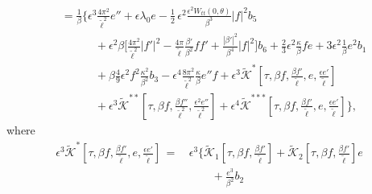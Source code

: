 \documentclass[10pt, reqno]{amsart}
\numberwithin{equation}{section}
\theoremstyle{definition}
\begin{document}
{\begin{align}
 & = \frac {1}\beta \Bigg\{\epsilon^3\frac{4\pi^2}{{\tilde\ell}^2} e'' + \epsilon\lambda_0 e
 -\frac{1}{2}\, \epsilon^2 \frac{ \epsilon^2W_{tt}(0, \theta)}{\beta^3}|f|^2 b_5
\nonumber\\[2mm]
 & \qquad \quad+ \epsilon^2\beta\Bigg[\frac{4\pi^2}{{\tilde\ell}^2}|f'|^2
-\frac{4\pi}{{\tilde\ell}}\frac{\beta'}{\beta^2}ff'
+\frac{|\beta'|^2}{\beta^4} |f|^2
\Bigg] b_6
  +\frac 23\epsilon^2 \frac{\kappa}{\beta} fe
 + 3\epsilon^2 \frac{1}{\beta}e^2b_1
 \nonumber\\[2mm]
 & \qquad \quad
  + \beta\frac{4}{9} \epsilon^2 f^2 \frac{\kappa^2}{\beta^2} b_3
 - \epsilon^4 \frac{8\pi^2} {{\tilde\ell}^2} \frac{\kappa}{\beta} e'' f
 + \epsilon^3 \tilde{\mathcal K}^* \left[\tau, \beta f, \frac{\beta {f}'}{\tilde\ell}, e, \frac{\epsilon e'}{\tilde\ell}\right]
  \nonumber\\[2mm]
 & \qquad \quad
 + \epsilon^3 \tilde{\mathcal K}^{**} \left[\tau, \beta f, \frac{\beta f''}{\tilde\ell^2}, \frac{\epsilon^2 e''}{\tilde \ell^2}\right]
 + \epsilon^4 \tilde{\mathcal K}^{***} \left[\tau, \beta f, \frac{\beta {f}'}{\tilde\ell}, e, \frac{\epsilon e'}{\tilde\ell}\right] \Bigg\},
\end{align}
where
\begin{align*}
\epsilon^3 \tilde{\mathcal K}^* \left[\tau, \beta f, \frac{\beta {f}'}{\tilde\ell}, e, \frac{\epsilon e'}{\tilde\ell}\right]
\,=\, & \epsilon^3\Bigg\{\tilde{\mathcal K}_1\left[\tau, {\beta f}, \frac{\beta{ f}'}{\tilde\ell} \right]
+ \tilde{\mathcal K}_2\left[\tau, {\beta f}, \frac{\beta { f}'}{\tilde\ell}\right] e
\nonumber\\[2mm]
 & \qquad
 + \frac{e^3}{\beta^2}b_2

\end{align*}}
\end{document}
